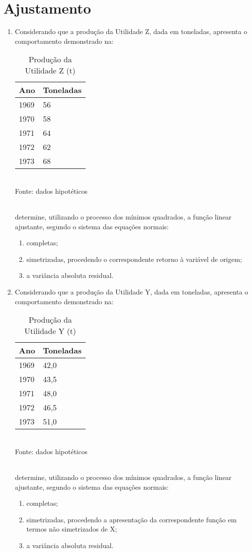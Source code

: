 \chapter{Ajustamento}

\begin{enumerate}[resume]

\item Considerando que a produção da Utilidade Z, dada em toneladas, apresenta o comportamento demonstrado na:
	\begin{table}[!htb]
	\centering
	\caption{Produção da Utilidade Z (t)}
	\vspace{0.5cm}
	\begin{tabular}{ll}
	Ano & Toneladas \\
	\hline 
	1969 & 56 \\
	1970 & 58 \\
	1971 & 64 \\
	1972 & 62 \\
	1973 & 68 \\
	\end{tabular}\\
	Fonte: dados hipotéticos
	\end{table}
	\\
	determine, utilizando o processo dos mínimos quadrados, a função linear ajustante, segundo o sistema das equações normais:
	\begin{enumerate}
	\item completas;
	\item simetrizadas, procedendo o correspondente retorno à variável de origem;
	\item a variância absoluta residual.	
	\end{enumerate}

\item Considerando que a produção da Utilidade Y, dada em toneladas, apresenta o comportamento demonstrado na:
	\begin{table}[!htb]
	\centering
	\caption{Produção da Utilidade Y (t)}
	\vspace{0.5cm}
	\begin{tabular}{ll}
	Ano & Toneladas \\
	\hline 
	1969 & 42,0 \\
	1970 & 43,5 \\
	1971 & 48,0 \\
	1972 & 46,5 \\
	1973 & 51,0 \\
	\end{tabular}\\
	Fonte: dados hipotéticos
	\end{table}
	\\
	determine, utilizando o processo dos mínimos quadrados, a função linear ajustante, segundo o sistema das equações normais:
	\begin{enumerate}
	\item completas;
	\item simetrizadas, procedendo a apresentação da correspondente função em termos não simetrizados de X;
	\item a variância absoluta residual.	
	\end{enumerate}
	

\end{enumerate}
